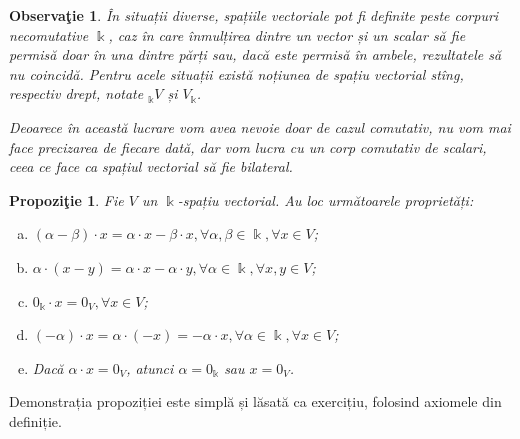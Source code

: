 \documentclass[11pt,a4paper]{article}
\theoremstyle{dotless}
\newtheorem{proposition}{Propozi\c{t}ie}[section]
\theoremstyle{dotlessdr}
\newtheorem{remark}{Observa\c{t}ie}[section]
\begin{document}
\begin{remark}
În situații diverse, spațiile vectoriale pot fi definite peste corpuri 
\emph{necomutative} $\Bbbk$, caz în care înmulțirea dintre un vector și un 
scalar să fie permisă doar în una dintre părți sau, dacă este permisă în ambele, 
rezultatele să nu coincidă. Pentru acele situații există noțiunea de 
\emph{spațiu vectorial stîng}, respectiv \emph{drept}, notate $_\Bbbk V$ și 
$V_\Bbbk$.

Deoarece în această lucrare vom avea nevoie doar de cazul comutativ, nu vom 
mai face precizarea de fiecare dată, dar vom lucra cu un corp comutativ de 
scalari, ceea ce face ca spațiul vectorial să fie bilateral.
\end{remark}

\begin{proposition}
Fie $V$ un $\Bbbk$-spațiu vectorial. Au loc următoarele proprietăți:
\begin{enumerate}[(a)]
\item $(\alpha - \beta) \cdot x = \alpha \cdot x - \beta \cdot x, 
\forall \alpha, \beta \in \Bbbk, \forall x \in V$;
\item $\alpha \cdot (x - y) = \alpha \cdot x - \alpha \cdot y, \forall 
\alpha \in \Bbbk, \forall x, y \in V$;
\item $0_\Bbbk \cdot x = 0_V, \forall x \in V$;
\item $(-\alpha) \cdot x = \alpha \cdot (-x) = - \alpha \cdot x, \forall 
\alpha \in \Bbbk, \forall x \in V$;
\item Dacă $\alpha \cdot x = 0_V$, atunci $\alpha = 0_\Bbbk$ sau $x = 0_V$.
\end{enumerate}
\end{proposition}

Demonstrația propoziției este simplă și lăsată ca exercițiu, folosind axiomele 
din definiție.
\end{document}
